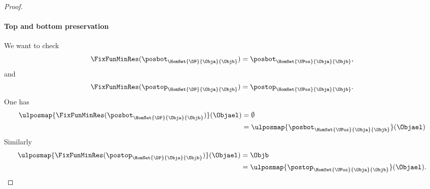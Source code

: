 \begin{proof}
\paragraph*{Top and bottom preservation}
We want to check
\begin{equation*}
\FixFunMinRes(\posbot_{\HomSet{\DP}{\Obja}{\Objb}})=\posbot_{\HomSet{\UPos}{\Obja}{\Objb}},
\end{equation*}
and
\begin{equation*}
\FixFunMinRes(\postop_{\HomSet{\DP}{\Obja}{\Objb}})=\postop_{\HomSet{\UPos}{\Obja}{\Objb}}.
\end{equation*}
One has
\begin{equation*}
\begin{aligned}
\ulposmap{\FixFunMinRes(\posbot_{\HomSet{\DP}{\Obja}{\Objb}})}(\Objael)&=\emptyset\\
&=\ulposmap{\posbot_{\HomSet{\UPos}{\Obja}{\Objb}}}(\Objael)
\end{aligned}
\end{equation*}
Similarly
\begin{equation*}
\begin{aligned}
\ulposmap{\FixFunMinRes(\postop_{\HomSet{\DP}{\Obja}{\Objb}})}(\Objael)&=\Objb\\
&=\ulposmap{\postop_{\HomSet{\UPos}{\Obja}{\Objb}}}(\Objael).
\end{aligned}
\end{equation*}
\end{proof}

